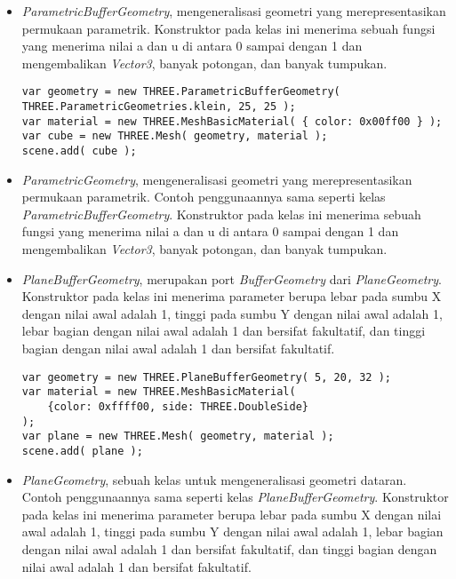 \begin{itemize}
\begin{itemize}
	\item {\it ParametricBufferGeometry}, mengeneralisasi geometri yang merepresentasikan permukaan parametrik. Konstruktor pada kelas ini menerima sebuah fungsi yang menerima nilai a dan u di antara 0 sampai dengan 1 dan mengembalikan {\it Vector3}, banyak potongan, dan banyak tumpukan.
	
\begin{lstlisting}[caption={Contoh penggunaan kelas {\it ParametricBufferGeometry}.},captionpos=b]
var geometry = new THREE.ParametricBufferGeometry( 
THREE.ParametricGeometries.klein, 25, 25 );
var material = new THREE.MeshBasicMaterial( { color: 0x00ff00 } );
var cube = new THREE.Mesh( geometry, material );
scene.add( cube );
\end{lstlisting}

	\item {\it ParametricGeometry}, mengeneralisasi geometri yang merepresentasikan permukaan parametrik. Contoh penggunaannya sama seperti kelas {\it ParametricBufferGeometry}. Konstruktor pada kelas ini menerima sebuah fungsi yang menerima nilai a dan u di antara 0 sampai dengan 1 dan mengembalikan {\it Vector3}, banyak potongan, dan banyak tumpukan.
	
	\item {\it PlaneBufferGeometry}, merupakan port {\it BufferGeometry} dari {\it PlaneGeometry}. Konstruktor pada kelas ini menerima parameter berupa lebar pada sumbu X dengan nilai awal adalah 1, tinggi pada sumbu Y dengan nilai awal adalah 1, lebar bagian dengan nilai awal adalah 1 dan bersifat fakultatif, dan tinggi bagian dengan nilai awal adalah 1 dan bersifat fakultatif.
	
\begin{lstlisting}[caption={Contoh penggunaan kelas {\it PlaneBufferGeometry}.},captionpos=b]
var geometry = new THREE.PlaneBufferGeometry( 5, 20, 32 );
var material = new THREE.MeshBasicMaterial( 
	{color: 0xffff00, side: THREE.DoubleSide} 
);
var plane = new THREE.Mesh( geometry, material );
scene.add( plane );
\end{lstlisting}

	\item {\it PlaneGeometry}, sebuah kelas untuk mengeneralisasi geometri dataran. Contoh penggunaannya sama seperti kelas {\it PlaneBufferGeometry}. Konstruktor pada kelas ini menerima parameter berupa lebar pada sumbu X dengan nilai awal adalah 1, tinggi pada sumbu Y dengan nilai awal adalah 1, lebar bagian dengan nilai awal adalah 1 dan bersifat fakultatif, dan tinggi bagian dengan nilai awal adalah 1 dan bersifat fakultatif.
	

\end{itemize}
\end{itemize}
